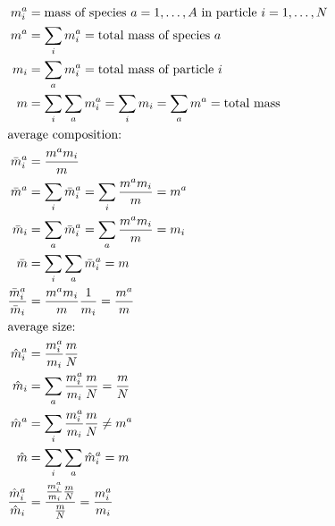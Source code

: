 \documentclass{article}
\begin{document}
\begin{align*}
  m_i^a &= \text{mass of species $a = 1,\ldots,A$ in particle $i = 1,\ldots,N$} \\
  m^a &= \sum_i m_i^a = \text{total mass of species $a$} \\
  m_i &= \sum_a m_i^a = \text{total mass of particle $i$} \\
  m &= \sum_i \sum_a m_i^a = \sum_i m_i = \sum_a m^a = \text{total mass} \\
  \intertext{average composition:}
  \bar{m}_i^a &= \frac{m^a m_i}{m} \\
  \bar{m}^a &= \sum_i \bar{m}_i^a = \sum_i \frac{m^a m_i}{m} = m^a \\
  \bar{m}_i &= \sum_a \bar{m}_i^a = \sum_a \frac{m^a m_i}{m} = m_i \\
  \bar{m} &= \sum_i \sum_a \bar{m}_i^a = m \\
  \frac{\bar{m}_i^a}{\bar{m}_i} &= \frac{m^a m_i}{m} \frac{1}{m_i} = \frac{m^a}{m} \\
  \intertext{average size:}
  \hat{m}_i^a &= \frac{m_i^a}{m_i} \frac{m}{N} \\
  \hat{m}_i &= \sum_a \frac{m_i^a}{m_i} \frac{m}{N} = \frac{m}{N} \\
  \hat{m}^a &= \sum_i \frac{m_i^a}{m_i} \frac{m}{N} \ne m^a \\
  \hat{m} &= \sum_i \sum_a \hat{m}_i^a = m \\
  \frac{\hat{m}_i^a}{\hat{m}_i} &= \frac{\frac{m_i^a}{m_i} \frac{m}{N}}{\frac{m}{N}} = \frac{m_i^a}{m_i}
\end{align*}
\end{document}
